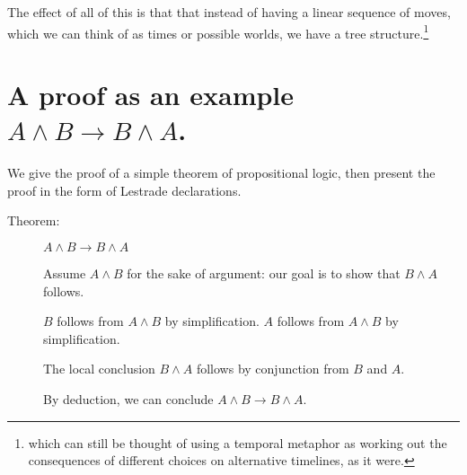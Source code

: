 \documentclass[12pt]{article}
\begin{document}
The effect of all of this is that that instead of having a linear sequence of moves, which we can think of as times or possible worlds, we have a tree structure.\footnote{which can still be thought of using a temporal metaphor as working out the consequences of different choices on alternative timelines, as it were.}

\section{A proof as an example $A \wedge B \rightarrow B \wedge A$.}

We give the proof of a simple theorem of propositional logic, then present the proof in the form of Lestrade declarations.

\begin{description}

\item[Theorem:]  $A \wedge B \rightarrow B \wedge A$

Assume $A \wedge B$ for the sake of argument:  our goal is to show that $B \wedge A$ follows.

$B$ follows from $A \wedge B$ by simplification.  $A$ follows from $A \wedge B$ by simplification.  

The local conclusion $B \wedge A$ follows by conjunction from $B$ and $A$.

By deduction, we can conclude $A \wedge B \rightarrow B \wedge A$.

\end{description}
\end{document}
